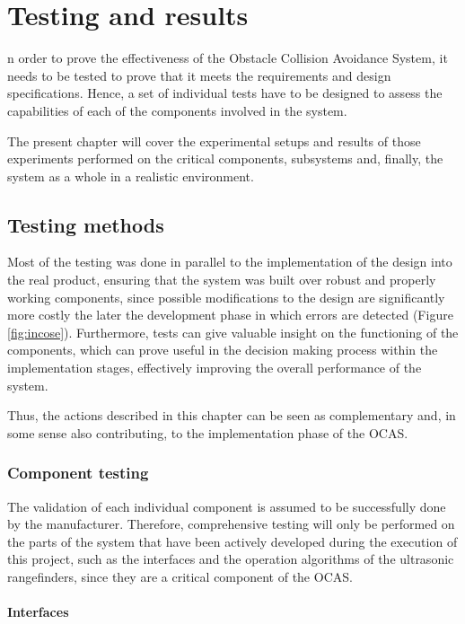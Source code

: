 
\let\textcircled=\pgftextcircled
\chapter{Testing and results} \label{chap:testing}

n order to prove the effectiveness of the Obstacle Collision Avoidance System, it needs to be tested to prove that it meets the requirements and design specifications.
Hence, a set of individual tests have to be designed to assess the capabilities of each of the components involved in the system.

The present chapter will cover the experimental setups and results of those experiments performed on the critical components, subsystems and, finally, the system as a whole in a realistic environment.


\section{Testing methods}

Most of the testing was done in parallel to the implementation of the design into the real product, ensuring that the system was built over robust and properly working components, since possible modifications to the design are significantly more costly the later the development phase in which errors are detected (Figure \ref{fig:incose}).
Furthermore, tests can give valuable insight on the functioning of the components, which can prove useful in the decision making process within the implementation stages, effectively improving the overall performance of the system.

Thus, the actions described in this chapter can be seen as complementary and, in some sense also contributing, to the implementation phase of the OCAS.

\subsection{Component testing}

The validation of each individual component is assumed to be successfully done by the manufacturer.
Therefore, comprehensive testing will only be performed on the parts of the system that have been actively developed during the execution of this project, such as the interfaces and the operation algorithms of the ultrasonic rangefinders, since they are a critical component of the OCAS.

\subsubsection{Interfaces}


